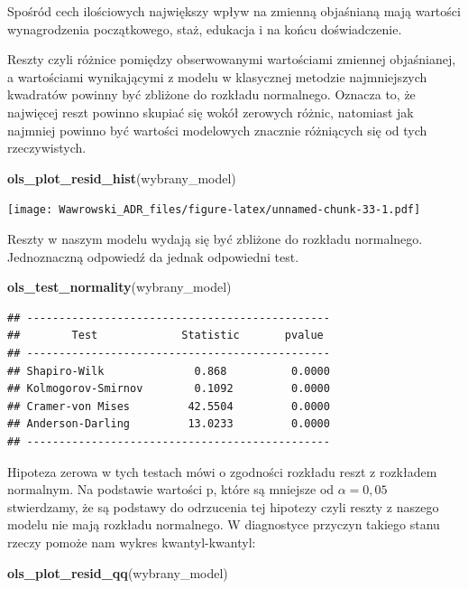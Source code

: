 \documentclass[
]{book}
\newenvironment{Shaded}{\begin{snugshade}}{\end{snugshade}}
\newcommand{\KeywordTok}[1]{\textcolor[rgb]{0.13,0.29,0.53}{\textbf{#1}}}
\newcommand{\NormalTok}[1]{#1}
\begin{document}
Spośród cech ilościowych największy wpływ na zmienną objaśnianą mają wartości wynagrodzenia początkowego, staż, edukacja i na końcu doświadczenie.

Reszty czyli różnice pomiędzy obserwowanymi wartościami zmiennej objaśnianej, a wartościami wynikającymi z modelu w klasycznej metodzie najmniejszych kwadratów powinny być zbliżone do rozkładu normalnego. Oznacza to, że najwięcej reszt powinno skupiać się wokół zerowych różnic, natomiast jak najmniej powinno być wartości modelowych znacznie różniących się od tych rzeczywistych.

\begin{Shaded}
\begin{Highlighting}[]
\KeywordTok{ols_plot_resid_hist}\NormalTok{(wybrany_model)}
\end{Highlighting}
\end{Shaded}

\texttt{[image: Wawrowski\_ADR\_files/figure-latex/unnamed-chunk-33-1.pdf]}

Reszty w naszym modelu wydają się być zbliżone do rozkładu normalnego. Jednoznaczną odpowiedź da jednak odpowiedni test.

\begin{Shaded}
\begin{Highlighting}[]
\KeywordTok{ols_test_normality}\NormalTok{(wybrany_model)}
\end{Highlighting}
\end{Shaded}

\begin{verbatim}
## -----------------------------------------------
##        Test             Statistic       pvalue  
## -----------------------------------------------
## Shapiro-Wilk              0.868          0.0000 
## Kolmogorov-Smirnov        0.1092         0.0000 
## Cramer-von Mises         42.5504         0.0000 
## Anderson-Darling         13.0233         0.0000 
## -----------------------------------------------
\end{verbatim}

Hipoteza zerowa w tych testach mówi o zgodności rozkładu reszt z rozkładem normalnym. Na podstawie wartości p, które są mniejsze od \(\alpha=0,05\) stwierdzamy, że są podstawy do odrzucenia tej hipotezy czyli reszty z naszego modelu nie mają rozkładu normalnego. W diagnostyce przyczyn takiego stanu rzeczy pomoże nam wykres kwantyl-kwantyl:

\begin{Shaded}
\begin{Highlighting}[]
\KeywordTok{ols_plot_resid_qq}\NormalTok{(wybrany_model)}
\end{Highlighting}
\end{Shaded}
\end{document}
